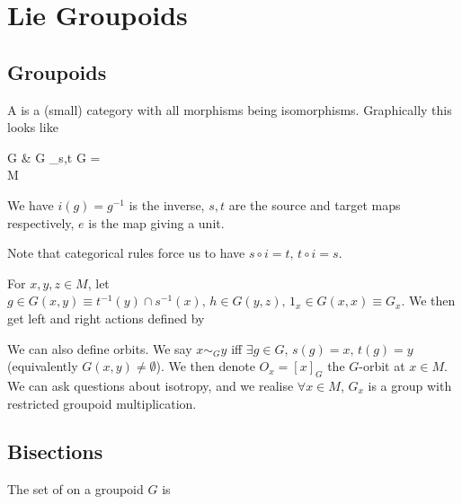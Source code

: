 \documentclass{article}
\begin{document}
\section{Lie Groupoids}

\subsection{Groupoids}

\begin{definition}
A  is a (small) category with all morphisms being isomorphisms. 
Graphically this looks like
\begin{tkz}
G   & G \times_{s,t} G =  \arrow[l,"m"'] \\
M \arrow[u,"e"', bend right = 50]
\end{tkz}
We have $i(g) = g^{-1}$ is the inverse, $s,t$ are the source and target maps respectively, $e$ is the map giving a unit.
\end{definition}
\begin{remark}
Note that categorical rules force us to have $s \circ i = t, \, t \circ i = s$. 
\end{remark}

For $x,y,z \in M$, let $g \in G(x,y) \equiv t^{-1}(y) \cap s^{-1}(x), \, h \in G(y,z), \, 1_x \in G(x,x) \equiv G_x$. We then get left and right actions defined by 

We can also define orbits. We say $x \sim_G y $ iff $\exists g \in G,\, s(g) = x, \, t(g) = y$ (equivalently $G(x,y) \neq \emptyset$). We then denote $O_x = [x]_G$ the $G$-orbit at $x \in M$.  \\
We can ask questions about isotropy, and we realise $\forall x \in M$, $G_x$ is a group with restricted groupoid multiplication. 

\subsection{Bisections}
\begin{definition}
The set of  on a groupoid $G$ is 
\end{definition}
\end{document}
